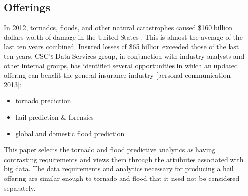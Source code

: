 \subsection{Offerings}
In 2012, tornados, floods, and other natural catastrophes caused \$160  billion dollars worth of damage in the United States \cite{stalder}. This is almost the average of the last ten years combined.  Insured losses of \$65 billion exceeded those of the last ten years. \textsc{CSC's} Data Services group, in conjunction with industry analysts and other internal groups,  has identified several opportunities  in which an updated \climatedge offering can benefit the general insurance industry [personal communication, 2013]:
\begin{itemize}
    \item tornado prediction
    \item hail prediction \& forensics
    \item global and domestic flood prediction
\end{itemize}
 This paper selects the tornado and flood predictive analytics as having contrasting requirements and views them through the attributes associated with big data. The data requirements and analytics necessary for producing a hail offering are similar enough to tornado and flood that it need not be considered separately.